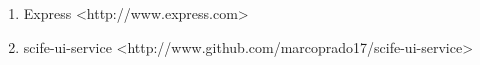 


\begin{enumerate}
\item\label{links:express} Express <http://www.express.com>
\item\label{links:scife-ui-service} scife-ui-service <http://www.github.com/marcoprado17/scife-ui-service>
\end{enumerate}